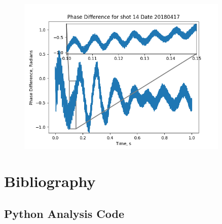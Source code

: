 \documentclass[12pt,a4paper,oneside]{report}
\begin{document}
\begin{figure}[H] 
\includegraphics[width=0.9\textwidth, center,angle=0]{DImages/Shot_14_20180417_Zoom_Plot.png}
\caption{}
\label{fig:PD-shot-14-20180416-zoomedplot}
\end{figure}

\pagebreak
\chapter{Bibliography}
	\printbibliography[heading=none]

\pagebreak


\setcounter{page}{2}
\begin{appendices}

%
\section{Python Analysis Code}

\end{appendices}
\end{document}
